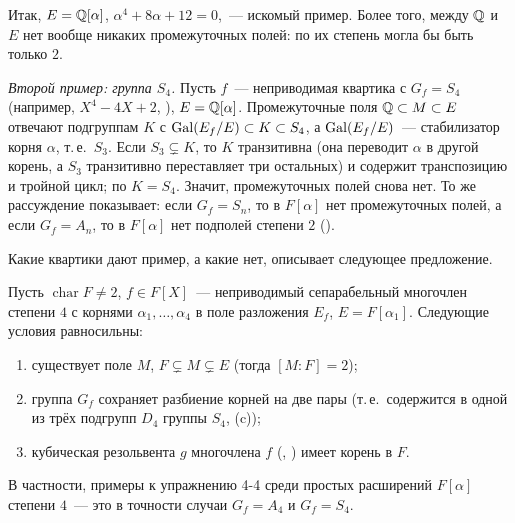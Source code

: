 Итак, $E=\mathbb Q[\alpha]$, $\alpha^4+8\alpha+12=0$,~--- искомый пример. Более того, между $\mathbb Q$ и $E$ нет вообще никаких
промежуточных полей: по  их степень могла бы быть только $2$.

\medskip\noindent\emph{Второй пример: группа $S_4$.} Пусть $f$~--- неприводимая квартика с $G_f=S_4$ (например,
$X^4-4X+2$, ), $E=\mathbb Q[\alpha]$. Промежуточные поля $\mathbb Q\subset M\subset E$ отвечают подгруппам $K$ с
$\operatorname{Gal}(E_f/E)\subset K\subset S_4$, а $\operatorname{Gal}(E_f/E)$~--- стабилизатор корня $\alpha$, т.\,е.\ $S_3$. Если $S_3\subsetneq K$, то $K$
транзитивна (она переводит $\alpha$ в другой корень, а $S_3$ транзитивно переставляет три остальных) и содержит
транспозицию и тройной цикл; по  $K=S_4$. Значит, промежуточных полей снова нет. То же рассуждение показывает: если
$G_f=S_n$, то в $F[\alpha]$ нет промежуточных полей, а если $G_f=A_n$, то в $F[\alpha]$ нет подполей степени $2$ ().

\medskip
Какие квартики дают пример, а какие нет, описывает следующее предложение.

\begin{proposition}[4.39n]
Пусть $\operatorname{char}F\ne2$, $f\in F[X]$~--- неприводимый сепарабельный многочлен степени $4$ с корнями
$\alpha_1,\dots,\alpha_4$ в поле разложения $E_f$, $E=F[\alpha_1]$. Следующие условия равносильны:
\begin{enumerate}[label=\textup{(\alph*)}]
\item существует поле $M$, $F\subsetneq M\subsetneq E$ \textup(тогда $[M:F]=2$\textup);
\item группа $G_f$ сохраняет разбиение корней на две пары \textup(т.\,е.\ содержится в одной из трёх подгрупп $D_4$
группы $S_4$, (c)\textup);
\item кубическая резольвента $g$ многочлена $f$ \textup(, \textup) имеет корень в $F$.
\end{enumerate}
В частности, примеры к упражнению 4-4 среди простых расширений $F[\alpha]$ степени $4$~--- это в точности случаи
$G_f=A_4$ и $G_f=S_4$.
\end{proposition}

